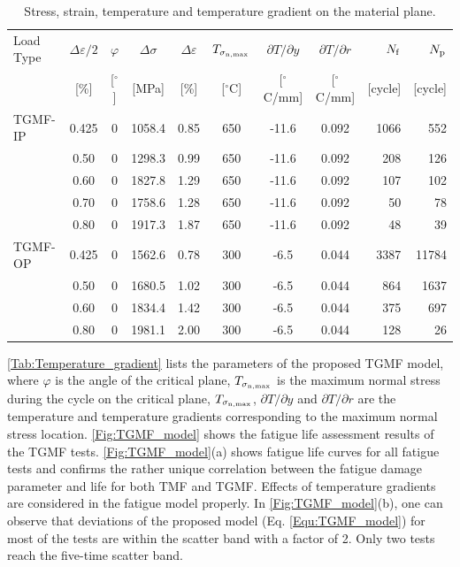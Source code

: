 \documentclass[preprint,5p,twocolumn,10pt,sort&compress]{elsarticle}
\begin{document}
\begin{table}
  \centering
  \caption{Stress, strain, temperature and temperature gradient on the material plane.}
    \begin{tabular}{lcccccccrr}
    \toprule
    Load Type & $\Delta\varepsilon/2$ & $\varphi$ & $\Delta\sigma$ & $\Delta\varepsilon$ & $T_{\sigma_{\rm n,\max}}$   & $\partial T/\partial y$ & $\partial T/\partial r$ & $N_{\rm{f}}$ & $N_{\rm{p}}$ \\
          & [\%]  & [$^{\circ}$] & [MPa] & [\%]  & [$^\circ$C]   & [$^\circ$C/mm] & [$^\circ$C/mm] & [cycle] & [cycle] \\
    \midrule
    TGMF-IP & 0.425   & 0     & 1058.4  & 0.85  & 650   & -11.6  & 0.092  & 1066  & 552 \\
      & 0.50   & 0     & 1298.3  & 0.99  & 650   & -11.6  & 0.092  & 208   & 126 \\
      & 0.60   & 0     & 1827.8  & 1.29  & 650   & -11.6  & 0.092  & 107   & 102 \\
      & 0.70   & 0     & 1758.6  & 1.28  & 650   & -11.6  & 0.092  & 50    & 78 \\
      & 0.80   & 0     & 1917.3  & 1.87  & 650   & -11.6  & 0.092  & 48    & 39 \\
    \midrule
    TGMF-OP & 0.425   & 0     & 1562.6  & 0.78  & 300   & -6.5  & 0.044  & 3387  & 11784 \\
      & 0.50   & 0     & 1680.5  & 1.02  & 300   & -6.5  & 0.044  & 864   & 1637 \\
      & 0.60   & 0     & 1834.4  & 1.42  & 300   & -6.5  & 0.044  & 375   & 697 \\
      & 0.80   & 0     & 1981.1  & 2.00  & 300   & -6.5  & 0.044  & 128   & 26 \\
    \bottomrule
    \end{tabular}%
  \label{Tab:Temperature_gradient}%
\end{table}%

\autoref{Tab:Temperature_gradient} lists the parameters of the proposed TGMF model, where $\varphi$ is the angle of the critical plane, $T_{\sigma_{\rm n,\max}}$ is the maximum normal stress during the cycle on the critical plane, $T_{\sigma_{\rm n,\max}}$, $\partial T/\partial y$ and $\partial T/\partial r$ are the temperature and temperature gradients corresponding to the maximum normal stress location.
\autoref{Fig:TGMF_model} shows the fatigue life assessment results of the TGMF tests. \autoref{Fig:TGMF_model}(a) shows fatigue life curves for all fatigue tests and confirms the rather unique correlation between the fatigue damage parameter and life for both TMF and TGMF. Effects of temperature gradients are considered in the fatigue model properly. In \autoref{Fig:TGMF_model}(b), one can observe that deviations of the proposed model (Eq. \eqref{Equ:TGMF_model}) for most of the tests are within the scatter band with a factor of 2. Only two tests reach the five-time scatter band. 
\end{document}
